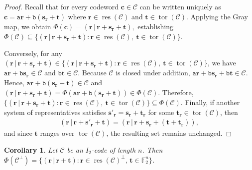 \documentclass[12pt]{article}
\newtheorem{corollary}[corollary]{Corollary}
\theoremstyle{definition}
\theoremstyle{plain}
\newcommand{\Blue}[1]{{ \color{blue} #1}}
\begin{document}
\begin{proof}
Recall that for every codeword $\mathbf{c} \in \mathcal{C}$ can be written uniquely as
$
\mathbf{c}
=
\mathtt{a}\mathbf{r} + \mathtt{b}(\mathbf{s}_{\mathbf{r}} + \mathbf{t})
$
where $\mathbf{r} \in \operatorname{res}(\mathcal{C})$ and $\mathbf{t} \in \operatorname{tor}(\mathcal{C})$. Applying the Gray map, we obtain
$
\Phi(\mathbf{c})
=
(\mathbf{r} \, | \,  \mathbf{r} + \mathbf{s}_{\mathbf{r}} + \mathbf{t}),
$
establishing
$
\Phi(\mathcal{C})
\subseteq
\{
(\mathbf{r} \, | \, \mathbf{r} + \mathbf{s}_{\mathbf{r}} + \mathbf{t})  \mathrel{:}
\mathbf{r} \in \operatorname{res}(\mathcal{C}),\
\mathbf{t} \in \operatorname{tor}(\mathcal{C})
\}
$.

Conversely, for any $(\mathbf{r} \, | \, \mathbf{r} + \mathbf{s}_{\mathbf{r}} + \mathbf{t})  \in
\{
(\mathbf{r} \, | \,  \mathbf{r} + \mathbf{s}_{\mathbf{r}} + \mathbf{t})  \mathrel{:}
\mathbf{r} \in \operatorname{res}(\mathcal{C}),\
\mathbf{t} \in \operatorname{tor}(\mathcal{C})
\}$, we have $\mathtt{a} \mathbf{r} + \mathtt{b} {\mathbf{s_r}} \in \mathcal{C}$ and $\mathtt{b} \mathbf{t} \in \mathcal{C}$. Because $\mathcal{C}$ is closed under addition, $\mathtt{a} \mathbf{r} + \mathtt{b} {\mathbf{s_r}} + \mathtt{b} \mathbf{t} \in \mathcal{C}$. Hence,  $\mathtt{a}\mathbf{r} + \mathtt{b} (\mathbf{s}_{\mathbf{r}} + \mathbf{t}) \in \mathcal{C}
$ and $
(\mathbf{r} \, | \, \mathbf{r} + \mathbf{s}_{\mathbf{r}} + \mathbf{t})  = \Phi (  \mathtt{a}\mathbf{r} + \mathtt{b} (\mathbf{s}_{\mathbf{r}} + \mathbf{t})  ) \in \Phi ( \mathcal{C} )$.
Therefore,
$
\{
(\mathbf{r} \, | \,  \mathbf{r} + \mathbf{s}_{\mathbf{r}} + \mathbf{t})  \mathrel{:}
\mathbf{r} \in \operatorname{res}(\mathcal{C}),\
\mathbf{t} \in \operatorname{tor}(\mathcal{C})
\}
\subseteq
\Phi ( \mathcal{C} )
$.
Finally, if another system of representatives satisfies
$\mathbf{s}'_{\mathbf{r}} = \mathbf{s}_{\mathbf{r}} + \mathbf{t}_{\mathbf{r}}$
for some $\mathbf{t}_{\mathbf{r}} \in \operatorname{tor}(\mathcal{C})$, then
\begin{align*}
(\mathbf{r} \, | \, \mathbf{r} + \mathbf{s}'_{\mathbf{r}} + \mathbf{t})
=
(\mathbf{r} \, | \, \mathbf{r} + \mathbf{s}_{\mathbf{r}} + (\mathbf{t} + \mathbf{t}_{\mathbf{r}})),
\end{align*}
and since $\mathbf{t}$ ranges over $\operatorname{tor}(\mathcal{C})$, the resulting set remains unchanged.
\end{proof}






\begin{corollary}  \label{cor:Gray image of dual of C}
Let $\mathcal{C}$ be an $I_2$-code of length $n$.  Then
$
\Phi(\mathcal{C}^\perp) = \{(\mathbf{r} \, | \,   \mathbf{r}  +  \mathbf{t}) \mathrel{:}   \mathbf{r}  \in\operatorname{res} ( \mathcal{C} )^\perp, \,  \mathbf{t}  \in  \mathbb{F} _2^n \}
$.
\end{corollary}
\end{document}
